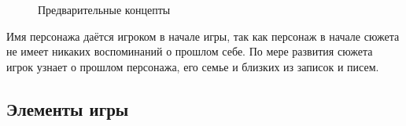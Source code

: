 \documentclass{article}
\begin{document}
\begin{figure}[H]
\begin{minipage}[h]{0.49\linewidth}
\end{minipage}
\caption{Предварительные концепты}
\label{ris:image1}
\end{figure}

Имя персонажа даётся игроком в начале игры, так как персонаж в начале сюжета не имеет никаких воспоминаний о прошлом себе. По мере развития сюжета игрок узнает о прошлом персонажа, его семье и близких из записок и писем.

\subsection{Элементы игры}
\end{document}
